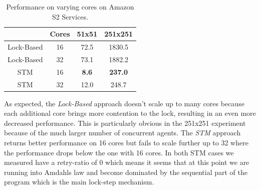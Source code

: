 \begin{table}
	\centering
  	\begin{tabular}{ c || c | c | c }
                   & Cores & 51x51   & 251x251 \\ \hline \hline 
    	Lock-Based & 16    & 72.5    & 1830.5  \\ \hline
    	Lock-Based & 32    & 73.1    & 1882.2  \\ \hline \hline 
   		
   		STM        & 16    & \textbf{8.6}     & \textbf{237.0}   \\ \hline
   		STM        & 32    & 12.0    & 248.7   \\ \hline \hline
   	\end{tabular}
  	
  	\caption{Performance on varying cores on Amazon S2 Services.}
	\label{tab:sir_varying_cores_amazon}
\end{table}

As expected, the \textit{Lock-Based} approach doesn't scale up to many cores because each additional core brings more contention to the lock, resulting in an even more decreased performance. This is particularly obvious in the 251x251 experiment because of the much larger number of concurrent agents. The \textit{STM} approach returns better performance on 16 cores but fails to scale further up to 32 where the performance drops below the one with 16 cores. In both STM cases we measured have a retry-ratio of 0 which means it seems that at this point we are running into Amdahls law and become dominated by the sequential part of the program which is the main lock-step mechanism. 

%


